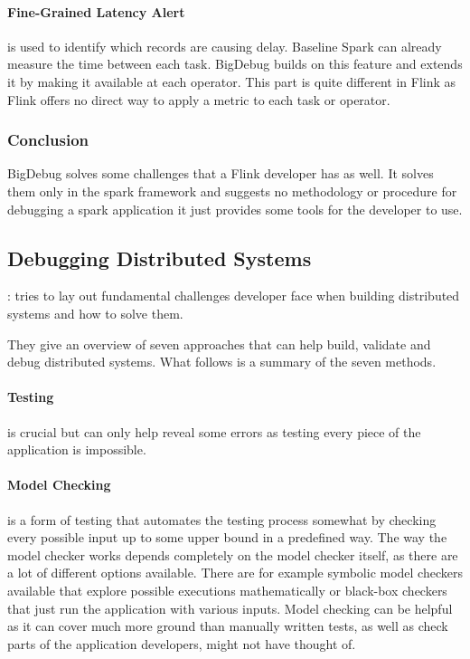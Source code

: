 \paragraph{Fine-Grained Latency Alert} is used to identify which records are causing delay. Baseline Spark can already measure the time between each task. BigDebug builds on this feature and extends it by making it available at each operator. This part is quite different in Flink as Flink offers no direct way to apply a metric to each task or operator.

\subsubsection{Conclusion}
BigDebug solves some challenges that a Flink developer has as well. It solves them only in the spark framework and suggests no methodology or procedure for debugging a spark application it just provides some tools for the developer to use.

\subsection{Debugging Distributed Systems}
\label{debuggingDistributedSystems}

\cite{Beschastnikh:2016:DDS:2927299.2940294}: tries to lay out fundamental challenges developer face when building distributed systems and how to solve them.

They give an overview of seven approaches that can help build, validate and debug distributed systems. What follows is a summary of the seven methods.

\paragraph{Testing} is crucial but can only help reveal some errors as testing every piece of the application is impossible.

\paragraph{Model Checking} is a form of testing that automates the testing process somewhat by checking every possible input up to some upper bound in a predefined way. The way the model checker works depends completely on the model checker itself, as there are a lot of different options available. There are for example symbolic model checkers available that explore possible executions mathematically or black-box checkers that just run the application with various inputs. Model checking can be helpful as it can cover much more ground than manually written tests, as well as check parts of the application developers, might not have thought of.

